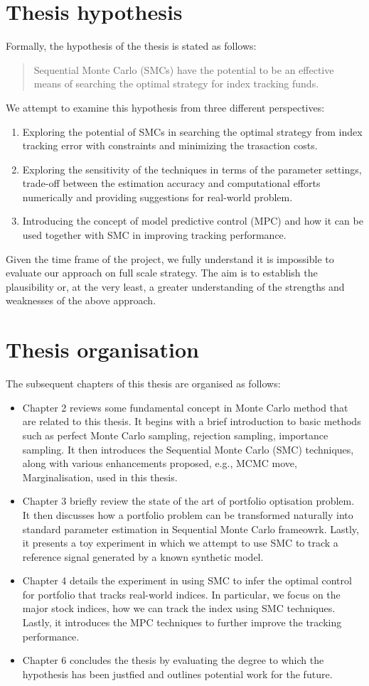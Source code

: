 \section{Thesis hypothesis}
Formally, the hypothesis of the thesis is stated as follows:
\begin{quote}
Sequential Monte Carlo (SMCs) have the potential to be an effective means of searching the optimal strategy for index tracking funds.
\end{quote}
We attempt to examine this hypothesis from three different perspectives:
\begin{enumerate}
\item Exploring the potential of SMCs in searching the optimal strategy from index tracking error with constraints and minimizing the trasaction costs.
\item Exploring the sensitivity of the techniques in terms of the parameter settings, trade-off between the estimation accuracy and computational efforts numerically and providing suggestions for real-world problem.
\item Introducing the concept of model predictive control (MPC) and how it can be used together with SMC in improving tracking performance.
\end{enumerate}
Given the time frame of the project, we fully understand it is impossible to evaluate our approach on full scale strategy. The aim is to establish the plausibility or, at the very least, a greater understanding of the strengths and weaknesses of the above approach.

\section{Thesis organisation}
The subsequent chapters of this thesis are organised as follows:
\begin{itemize}
\item Chapter 2 reviews some fundamental concept in Monte Carlo method that are related to this thesis. It begins with a brief introduction to basic methods such as perfect Monte Carlo sampling, rejection sampling, importance sampling. It then  introduces the Sequential Monte Carlo (SMC) techniques, along with various enhancements proposed, e.g., MCMC move, Marginalisation, used in this thesis.
\item Chapter 3 briefly review the state of the art of portfolio optisation problem. It then discusses how a portfolio problem can be transformed naturally into standard parameter estimation in Sequential Monte Carlo frameowrk.
Lastly, it presents a toy experiment in which we attempt to use SMC to track a reference signal generated by a known synthetic model. 
\item Chapter 4 details the experiment in using SMC to infer the optimal control for portfolio that tracks real-world indices. In particular, we focus on the major stock indices, how we can track the index using SMC techniques. Lastly, it introduces the MPC techniques to further improve the tracking performance.
\item Chapter 6 concludes the thesis by evaluating the degree to which the hypothesis has been justfied and outlines potential work for the future.
\end{itemize}



